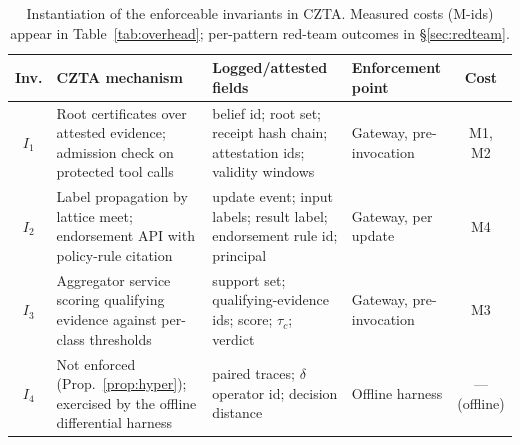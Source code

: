 \documentclass[conference]{IEEEtran}
\newcommand{\Ione}{\ensuremath{I_1}}
\newcommand{\Itwo}{\ensuremath{I_2}}
\newcommand{\Ithree}{\ensuremath{I_3}}
\newcommand{\Ifour}{\ensuremath{I_4}}
\begin{document}
\begin{table}[t]
\centering
\caption{Instantiation of the enforceable invariants in CZTA.
Measured costs (M-ids) appear in Table~\ref{tab:overhead};
per-pattern red-team outcomes in \S\ref{sec:redteam}.}
\label{tab:instantiation}
\scriptsize
\setlength{\tabcolsep}{2.8pt}
\begin{tabularx}{\columnwidth}{@{}c >{\raggedright\arraybackslash}p{2.26cm} >{\raggedright\arraybackslash}X >{\raggedright\arraybackslash}p{1.5cm} c@{}}
\toprule
Inv. & CZTA mechanism & Logged/attested fields & Enforcement point & Cost \\
\midrule
\Ione & Root certificates over attested evidence; admission check on protected tool calls & belief id; root set; receipt hash chain; attestation ids; validity windows & Gateway, pre-invocation & M1, M2 \\
\Itwo & Label propagation by lattice meet; endorsement API with policy-rule citation & update event; input labels; result label; endorsement rule id; principal & Gateway, per update & M4 \\
\Ithree & Aggregator service scoring qualifying evidence against per-class thresholds & support set; qualifying-evidence ids; score; $\tau_c$; verdict & Gateway, pre-invocation & M3 \\
\Ifour & Not enforced (Prop.~\ref{prop:hyper}); exercised by the offline differential harness & paired traces; $\delta$ operator id; decision distance & Offline harness & --- (offline) \\
\bottomrule
\end{tabularx}
\end{table}
\end{document}
